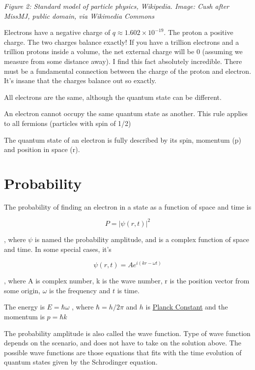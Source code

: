 {
\centering
{}
}

\emph{Figure 2: Standard model of particle physics, Wikipedia. Image:
Cush after MissMJ, public domain, via Wikimedia Commons}

Electrons have a negative charge of \(q \approx 1.602 \times 10^{-19}\).
The proton a positive charge. The two charges balance exactly! If you
have a trillion electrons and a trillion protons inside a volume, the
net external charge will be \(0\) (assuming we measure from some
distance away). I find this fact absolutely incredible. There must be a
fundamental connection between the charge of the proton and electron.
It's insane that the charges balance out so exactly.

All electrons are the same, although the quantum state can be different.

An electron cannot occupy the same quantum state as another. This rule
applies to all fermions (particles with spin of 1/2)

The quantum state of an electron is fully described by its spin,
momentum (p) and position in space (r).

\section{Probability}\label{probability}

The probability of finding an electron in a state as a function of space
and time is

\[ P = \vert \psi(r,t)\vert ^2 \]

, where \(\psi\) is named the probability amplitude, and is a complex
function of space and time. In some special cases, it's

\[ \psi(r,t) = A e^{i( kr - \omega t)}\]

, where A is complex number, k is the wave number, r is the position
vector from some origin, \(\omega\) is the frequency and \(t\) is time.

The energy is \(E = \hbar \omega\) , where \(\hbar = h/2\pi\) and \(h\)
is \href{https://en.wikipedia.org/wiki/Planck_constant}{Planck Constant}
and the momentum is \(p = \hbar k\)

The probability amplitude is also called the wave function. Type of wave
function depends on the scenario, and does not have to take on the
solution above. The possible wave functions are those equations that
fits with the time evolution of quantum states given by the Schrodinger
equation.

